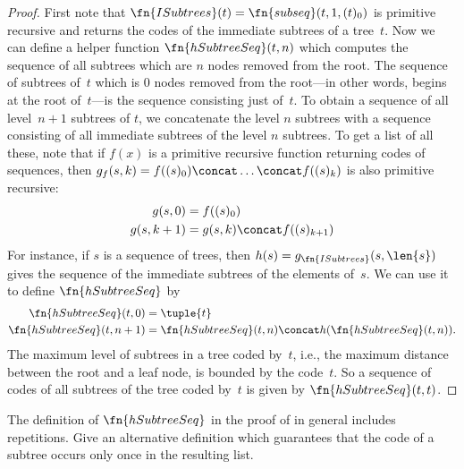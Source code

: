 \documentclass[../../../include/open-logic-section]{subfiles}
\begin{document}
\begin{proof}
  First note that $\fn{ISubtrees}(t) = \fn{subseq}(t, 1, (t)_0)$ is
  primitive recursive and returns the codes of the immediate subtrees
  of a tree~$t$. Now we can define a helper function
  $\fn{hSubtreeSeq}(t,n)$ which computes the sequence of all subtrees
  which are $n$ nodes removed from the root. The sequence of subtrees
  of~$t$ which is $0$ nodes removed from the root---in other words,
  begins at the root of~$t$---is the sequence consisting just
  of~$t$. To obtain a sequence of all level~$n+1$ subtrees of $t$, we
  concatenate the level $n$ subtrees with a sequence consisting of all
  immediate subtrees of the level $n$ subtrees. To get a list of all
  these, note that if $f(x)$ is a primitive recursive function
  returning codes of sequences, then $g_f(s, k) = f((s)_0) \concat
  \dots \concat f((s)_k)$ is also primitive recursive:
    \begin{align*}
      g(s, 0) & = f((s)_0)\\
      g(s, k+1) & = g(s, k) \concat f((s)_{k+1})
    \end{align*}
    For instance, if $s$ is a sequence of trees, then
    $h(s) = g_{\fn{ISubtrees}}(s, \len{s})$ gives the sequence of the
    immediate subtrees of the elements of~$s$. We can use it to define
    $\fn{hSubtreeSeq}$ by
    \begin{align*}
      \fn{hSubtreeSeq}(t, 0) & = \tuple{t} \\
      \fn{hSubtreeSeq}(t, n+1) & = \fn{hSubtreeSeq}(t, n) \concat
      h(\fn{hSubtreeSeq}(t, n)).
    \end{align*}
    The maximum level of subtrees in a tree coded by~$t$, i.e., the
    maximum distance between the root and a leaf node, is bounded by
    the code~$t$. So a sequence of codes of all subtrees of the tree
    coded by~$t$ is given by $\fn{hSubtreeSeq}(t, t)$.
\end{proof}

\begin{prob}
  The definition of $\fn{hSubtreeSeq}$ in the proof of
   in general includes
  repetitions. Give an alternative definition which guarantees that
  the code of a subtree occurs only once in the resulting list.
\end{prob}
\end{document}
